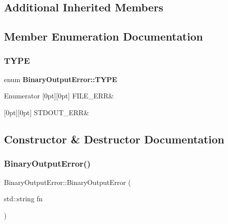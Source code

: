 \subsection*{Additional Inherited Members}


\subsection{Member Enumeration Documentation}
\mbox{\label{classBinaryOutputError_a7b16a5e7bb3efac8bd37555a1da4db6c}} 
\subsubsection{T\+Y\+PE}
{\footnotesize\ttfamily enum \textbf{ Binary\+Output\+Error\+::\+T\+Y\+PE}}

\begin{DoxyEnumFields}{Enumerator}
[0pt][0pt]{}\mbox{\label{classBinaryOutputError_a7b16a5e7bb3efac8bd37555a1da4db6caaa6585014f63247bc991e256c76fa1fa}} 
F\+I\+L\+E\+\_\+\+E\+RR&\\
\hline

[0pt][0pt]{}\mbox{\label{classBinaryOutputError_a7b16a5e7bb3efac8bd37555a1da4db6ca67dab9937d3cf0e71109946f73d53b3f}} 
S\+T\+D\+O\+U\+T\+\_\+\+E\+RR&\\
\hline

\end{DoxyEnumFields}


\subsection{Constructor \& Destructor Documentation}
\mbox{\label{classBinaryOutputError_a401d62a6882f3caf9423e7f1e0131522}} 
\subsubsection{Binary\+Output\+Error()}
{\footnotesize\ttfamily Binary\+Output\+Error\+::\+Binary\+Output\+Error (\begin{DoxyParamCaption}\item[{std\+::string}]{fn }\end{DoxyParamCaption})}



